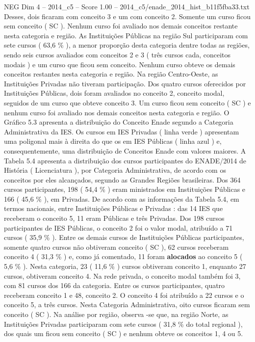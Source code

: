 \begin{textsample}{NEG Dim 4 – 2014\_c5 – Score 1.00 – 2014\_c5/enade\_2014\_hist\_b11f5fba33.txt}
Desses, dois ficaram com conceito 3 e um com conceito 2.
Somente um curso ficou sem conceito ( SC ).
Nenhum curso foi avaliado nos demais conceitos restante nesta categoria e região.
As Instituições Públicas na região Sul participaram com sete cursos ( 63,6 \% ), a menor proporção desta categoria dentre todas as regiões, sendo seis cursos avaliados com conceitos 2 e 3 ( três cursos cada, conceitos modais ) e um curso que ficou sem conceito.
Nenhum curso obteve os demais conceitos restantes nesta categoria e região.
Na região Centro-Oeste, as Instituições Privadas não tiveram participação.
Dos quatro cursos oferecidos por Instituições Públicas, dois foram avaliados no conceito 2, conceito modal, seguidos de um curso que obteve conceito 3.
Um curso ficou sem conceito ( SC ) e nenhum curso foi avaliado nos demais conceitos nesta categoria e região.
O Gráfico 5.3 apresenta a distribuição do Conceito Enade segundo a Categoria Administrativa da IES.
Os cursos em IES Privadas ( linha verde ) apresentam uma poligonal mais à direita do que os em IES Públicas ( linha azul ) e, consequentemente, uma distribuição de Conceitos Enade com valores maiores.
A Tabela 5.4 apresenta a distribuição dos cursos participantes do ENADE/2014 de História ( Licenciatura ), por Categoria Administrativa, de acordo com os conceitos por eles alcançados, segundo as Grandes Regiões brasileiras.
Dos 364 cursos participantes, 198 ( 54,4 \% ) eram ministrados em Instituições Públicas e 166 ( 45,6 \% ), em Privadas.
De acordo com as informações da Tabela 5.4, em termos nacionais, entre Instituições Públicas e Privadas : das 14 IES que receberam o conceito 5, 11 eram Públicas e três Privadas.
Dos 198 cursos participantes de IES Públicas, o conceito 2 foi o valor modal, atribuído a 71 cursos ( 35,9 \% ).
Entre os demais cursos de Instituições Públicas participantes, somente quatro cursos não obtiveram conceito ( SC ), 62 cursos receberam conceito 4 ( 31,3 \% ) e, como já comentado, 11 foram \textbf{alocados} ao conceito 5 ( 5,6 \% ).
Nesta categoria, 23 ( 11,6 \% ) cursos obtiveram conceito 1, enquanto 27 cursos, obtiveram conceito 4.
Na rede privada, o conceito modal também foi 3, com 81 cursos dos 166 da categoria.
Entre os cursos participantes, quatro receberam conceito 1 e 48, conceito 2.
O conceito 4 foi atribuído a 22 cursos e o conceito 5, a três cursos.
Nesta Categoria Administrativa, oito cursos ficaram sem conceito ( SC ).
Na análise por região, observa -se que, na região Norte, as Instituições Privadas participaram com sete cursos ( 31,8 \% do total regional ), dos quais um ficou sem conceito ( SC ) e nenhum obteve os conceitos 1, 4 ou 5.

\end{textsample}
